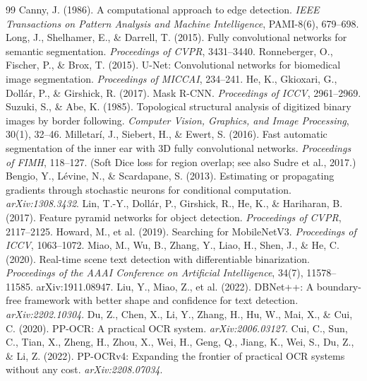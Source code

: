 \documentclass[11pt,a4paper]{article}
\newcommand{\1}{\mathbf{1}}
\begin{document}
\begin{thebibliography}{99}
     Canny, J. (1986). A computational approach to edge detection. \emph{IEEE Transactions on Pattern Analysis and Machine Intelligence}, PAMI-8(6), 679--698.
     Long, J., Shelhamer, E., \& Darrell, T. (2015). Fully convolutional networks for semantic segmentation. \emph{Proceedings of CVPR}, 3431--3440.
     Ronneberger, O., Fischer, P., \& Brox, T. (2015). U-Net: Convolutional networks for biomedical image segmentation. \emph{Proceedings of MICCAI}, 234--241.
     He, K., Gkioxari, G., Doll\'ar, P., \& Girshick, R. (2017). Mask R-CNN. \emph{Proceedings of ICCV}, 2961--2969.
     Suzuki, S., \& Abe, K. (1985). Topological structural analysis of digitized binary images by border following. \emph{Computer Vision, Graphics, and Image Processing}, 30(1), 32--46.
     Milletar\'i, J., Siebert, H., \& Ewert, S. (2016). Fast automatic segmentation of the inner ear with 3D fully convolutional networks. \emph{Proceedings of FIMH}, 118--127. (Soft Dice loss for region overlap; see also Sudre et al., 2017.)
     Bengio, Y., L\'evine, N., \& Scardapane, S. (2013). Estimating or propagating gradients through stochastic neurons for conditional computation. \emph{arXiv:1308.3432}.
     Lin, T.-Y., Doll\'ar, P., Girshick, R., He, K., \& Hariharan, B. (2017). Feature pyramid networks for object detection. \emph{Proceedings of CVPR}, 2117--2125.
     Howard, M., et al. (2019). Searching for MobileNetV3. \emph{Proceedings of ICCV}, 1063--1072.
     Miao, M., Wu, B., Zhang, Y., Liao, H., Shen, J., \& He, C. (2020). Real-time scene text detection with differentiable binarization. \emph{Proceedings of the AAAI Conference on Artificial Intelligence}, 34(7), 11578--11585. arXiv:1911.08947.
     Liu, Y., Miao, Z., et al. (2022). DBNet++: A boundary-free framework with better shape and confidence for text detection. \emph{arXiv:2202.10304}.
     Du, Z., Chen, X., Li, Y., Zhang, H., Hu, W., Mai, X., \& Cui, C. (2020). PP-OCR: A practical OCR system. \emph{arXiv:2006.03127}.
     Cui, C., Sun, C., Tian, X., Zheng, H., Zhou, X., Wei, H., Geng, Q., Jiang, K., Wei, S., Du, Z., \& Li, Z. (2022). PP-OCRv4: Expanding the frontier of practical OCR systems without any cost. \emph{arXiv:2208.07034}.
\end{thebibliography}
\end{document}
